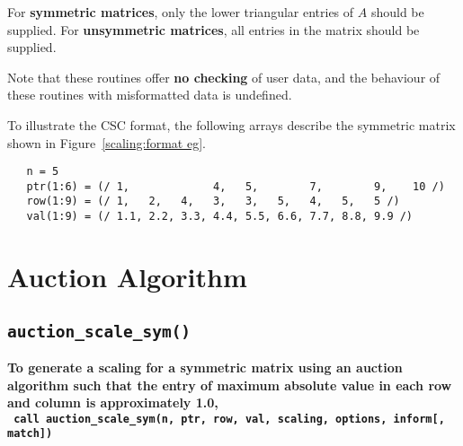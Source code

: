 For \textbf{symmetric matrices}, only the lower triangular entries of $A$
should be supplied. For \textbf{unsymmetric matrices}, all entries in the matrix
should be supplied.

Note that these routines offer \textbf{no checking} of user data, and the
behaviour of these routines with misformatted data is undefined.

To illustrate the CSC format, the following arrays describe the symmetric
matrix shown in Figure~\ref{scaling:format eg}.
\begin{verbatim}
   n = 5
   ptr(1:6) = (/ 1,             4,   5,        7,        9,    10 /)
   row(1:9) = (/ 1,   2,   4,   3,   3,   5,   4,   5,   5 /)
   val(1:9) = (/ 1.1, 2.2, 3.3, 4.4, 5.5, 6.6, 7.7, 8.8, 9.9 /)
\end{verbatim}



\section{Auction Algorithm}

\subsection{\texttt{auction\_scale\_sym()}}

\textbf{\noindent
   To generate a scaling for a symmetric matrix using an auction algorithm such that the entry of maximum absolute value in each row and column is approximately 1.0,
   \vspace*{0.3cm} \\
   \texttt{ \hspace*{0.2cm}
      call auction\_scale\_sym(n, ptr, row, val, scaling, options, inform[, match])
   }
   \vspace{0.3cm}
}

